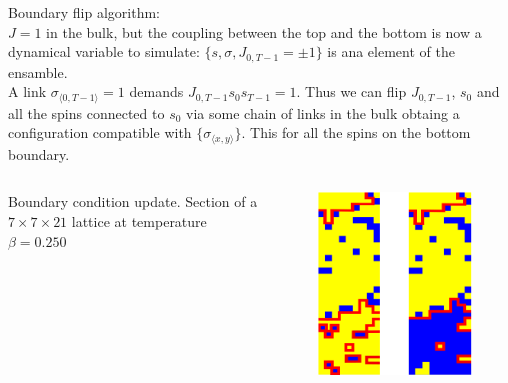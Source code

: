 \documentclass[12pt,handout]{beamer}
\begin{document}
\begin{frame}
\begin{center}

{\Large Boundary flip algorithm:\\}
\vspace{20pt}
$J = 1$ in the bulk, but the coupling between the top and the bottom is now a dynamical variable to simulate: $\lbrace s, \sigma, J_{0, T-1} = \pm 1 \rbrace$ is ana element of the ensamble.\\
\vspace{20pt}
A link $\sigma_{\langle 0, T-1 \rangle} = 1$ demands $J_{0, T-1} s_0 s_{T-1} = 1$. Thus we can flip $J_{0, T-1}$, $s_0$ and all the spins connected to $s_0$ via some chain of links in the bulk obtaing a configuration compatible with $\lbrace \sigma_{\langle x, y \rangle} \rbrace $. This for all the spins on the bottom boundary.

\end{center}
\end{frame}

\begin{frame}
\begin{center}
\begin{columns}
\begin{column}{0.20\textwidth}
\begin{center}
Boundary condition update.
Section of a $7 \times 7 \times 21$ lattice at temperature $\beta = 0.250$
\end{center}
\end{column}
\begin{column}{0.80\textwidth}
\begin{figure}[!htb]
\centering
\includegraphics[scale=0.5]{boundaryFlip.png}
\end{figure}

\end{column}
\end{columns}

\end{center}
\end{frame}
\end{document}
